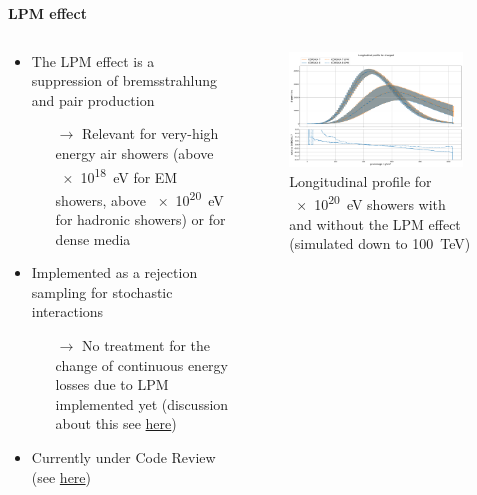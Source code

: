 \documentclass[aspectratio=1610, 9pt]{beamer}
\begin{document}
\begin{frame}

\textbf{LPM effect}

    \begin{columns}[onlytextwidth]
        \begin{column}{0.45\textwidth}
            \begin{itemize}
              \item The LPM effect is a suppression of bremsstrahlung and pair production
              \begin{itemize}
                \item[$\rightarrow$] Relevant for very-high energy air showers (above \SI{e18}{\electronvolt} for EM showers, above \SI{e20}{\electronvolt} for hadronic showers\footnotemark) or for dense media
              \end{itemize}
              \item Implemented as a rejection sampling for stochastic interactions
              \begin{itemize}
                \item[$\rightarrow$] No treatment for the change of continuous energy losses due to LPM implemented yet (discussion about this see \href{https://indico.scc.kit.edu/event/2580/contributions/9629/attachments/4716/7107/lpm_effect.pdf}{here})
              \end{itemize}
              \item Currently under Code Review (see \href{https://gitlab.iap.kit.edu/AirShowerPhysics/corsika/-/merge_requests/471}{here})
            \end{itemize}
        \end{column}
        \begin{column}{0.55\textwidth}
            \begin{figure}
                \centering
                \includegraphics[width=0.95\textwidth]{plots/long_charged_LPM.png}
                \caption{Longitudinal profile for \SI{e20}{\electronvolt} showers with and without the LPM effect (simulated down to \SI{100}{\tera\electronvolt})}
            \end{figure}
        \end{column}
    \end{columns}
\end{frame}
\end{document}
